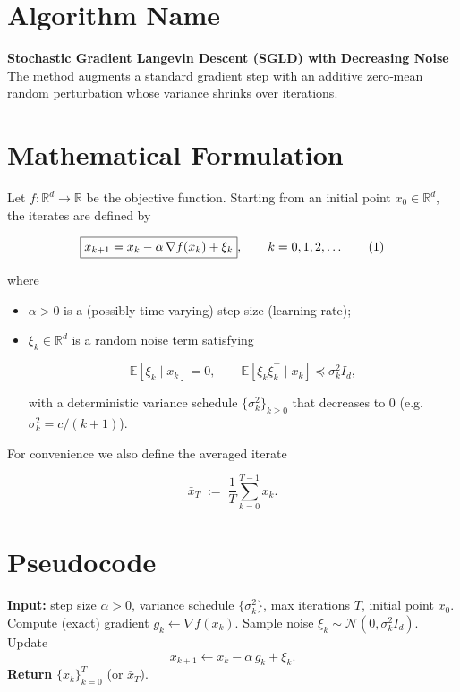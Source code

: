 \documentclass[11pt]{article}
\newcommand{\E}{\mathbb{E}}
\newcommand{\R}{\mathbb{R}}
\begin{document}
\section*{Algorithm Name}
\textbf{Stochastic Gradient Langevin Descent (SGLD) with Decreasing Noise}\\[4pt]
The method augments a standard gradient step with an additive
zero‑mean random perturbation whose variance shrinks over iterations.

\section*{Mathematical Formulation}
Let $f:\R^{d}\rightarrow\R$ be the objective function.
Starting from an initial point $x_{0}\in\R^{d}$, the iterates are defined by  

\[
\boxed{%
x_{k+1}=x_{k}-\alpha\,\nabla f(x_{k})+\xi_{k}},\qquad k=0,1,2,\dots
\tag{1}
\]

where  

\begin{itemize}
\item $\alpha>0$ is a (possibly time‑varying) step size (learning rate);
\item $\xi_{k}\in\R^{d}$ is a random noise term satisfying  

\[
\E[\xi_{k}\mid x_{k}]=0,\qquad 
\E[\xi_{k}\xi_{k}^{\!\top}\mid x_{k}]\preceq\sigma_{k}^{2}I_{d},
\tag{2}
\]

with a deterministic variance schedule $\{\sigma_{k}^{2}\}_{k\ge 0}$ that
decreases to $0$ (e.g. $\sigma_{k}^{2}=c/(k+1)$).
\end{itemize}

For convenience we also define the averaged iterate  

\[
\bar{x}_{T}\;:=\;\frac{1}{T}\sum_{k=0}^{T-1}x_{k}.
\tag{3}
\]

\section*{Pseudocode}
\begin{algorithm}[H]
\caption{SGLD with Decreasing Noise}
\begin{algorithmic}[1]
\State \textbf{Input:} step size $\alpha>0$, variance schedule $\{\sigma_{k}^{2}\}$, 
max iterations $T$, initial point $x_{0}$.
    \State Compute (exact) gradient $g_{k}\gets\nabla f(x_{k})$.
    \State Sample noise $\xi_{k}\sim\mathcal{N}(0,\sigma_{k}^{2}I_{d})$.
    \State Update 
    \[
    x_{k+1}\gets x_{k}-\alpha\,g_{k}+\xi_{k}.
    \]
\EndFor
\State \textbf{Return} $\{x_{k}\}_{k=0}^{T}$ (or $\bar{x}_{T}$).
\end{algorithmic}
\end{algorithm}
\end{document}
